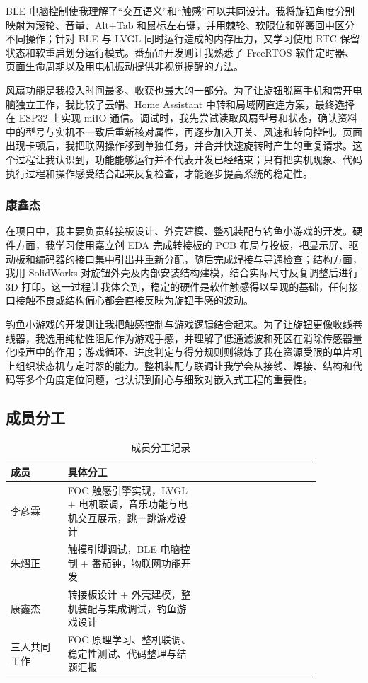 \documentclass[12pt,a4paper,UTF8]{ctexart}
\begin{document}
BLE 电脑控制使我理解了“交互语义”和“触感”可以共同设计。我将旋钮角度分别映射为滚轮、音量、Alt+Tab 和鼠标左右键，并用棘轮、软限位和弹簧回中区分不同操作；针对 BLE 与 LVGL 同时运行造成的内存压力，又学习使用 RTC 保留状态和软重启划分运行模式。番茄钟开发则让我熟悉了 FreeRTOS 软件定时器、页面生命周期以及用电机振动提供非视觉提醒的方法。

风扇功能是我投入时间最多、收获也最大的一部分。为了让旋钮脱离手机和常开电脑独立工作，我比较了云端、Home Assistant 中转和局域网直连方案，最终选择在 ESP32 上实现 miIO 通信。调试时，我先尝试读取风扇型号和状态，确认资料中的型号与实机不一致后重新核对属性，再逐步加入开关、风速和转向控制。页面出现卡顿后，我把联网操作移到单独任务，并合并快速旋转时产生的重复请求。这个过程让我认识到，功能能够运行并不代表开发已经结束；只有把实机现象、代码执行过程和操作感受结合起来反复检查，才能逐步提高系统的稳定性。

\subsubsection{康鑫杰}

在项目中，我主要负责转接板设计、外壳建模、整机装配与钓鱼小游戏的开发。硬件方面，我学习使用嘉立创 EDA 完成转接板的 PCB 布局与投板，把显示屏、驱动板和编码器的接口集中引出并重新分配，随后完成焊接与导通检查；结构方面，我用 SolidWorks 对旋钮外壳及内部安装结构建模，结合实际尺寸反复调整后进行 3D 打印。这一过程让我体会到，稳定的硬件是软件触感得以呈现的基础，任何接口接触不良或结构偏心都会直接反映为旋钮手感的波动。

钓鱼小游戏的开发则让我把触感控制与游戏逻辑结合起来。为了让旋钮更像收线卷线器，我选用纯粘性阻尼作为游戏手感，并理解了低通滤波和死区在消除传感器量化噪声中的作用；游戏循环、进度判定与得分规则则锻炼了我在资源受限的单片机上组织状态机与定时器的能力。整机装配与联调让我学会从接线、焊接、结构和代码等多个角度定位问题，也认识到耐心与细致对嵌入式工程的重要性。

\subsection{成员分工}

\begin{table}[H]
\centering
\small
\begin{tabular}{p{0.16\linewidth}p{0.38\linewidth}p{0.33\linewidth}}
\toprule
成员 & 具体分工   \\
\midrule
李彦霖 & FOC 触感引擎实现，LVGL + 电机联调，音乐功能与电机交互展示，跳一跳游戏设计
  \\
朱熠正 & 触摸引脚调试，BLE 电脑控制 + 番茄钟，物联网功能开发
   \\
康鑫杰 & 转接板设计 + 外壳建模，整机装配与集成调试，钓鱼游戏设计
  \\
三人共同工作 & FOC 原理学习、整机联调、稳定性测试、代码整理与结题汇报
  \\
\bottomrule
\end{tabular}
\caption{成员分工记录}
\label{tab:member-division}
\end{table}
\end{document}
